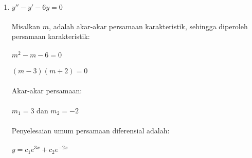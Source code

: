 \begin{enumerate}[1.]

	\item \begin{math} y'' - y' - 6y = 0 \end{math} \\ \\
	Misalkan \begin{math} m \end{math}, adalah akar-akar persamaan karakteristik, sehingga diperoleh persamaan karakteristik: \\ \\
	\begin{math} m^{2} - m - 6 = 0 \end{math} \\ \\
	\begin{math} (m - 3)(m + 2) = 0 \end{math} \\ \\
	Akar-akar persamaan: \\ \\
	\begin{math} m_1 = 3 \end{math} dan \begin{math} m_2 = -2 \end{math} \\ \\
	Penyelesaian umum persamaan diferensial adalah: \\ \\
	\begin{math} y = c_1 e^{3x} + c_2 e^{-2x} \end{math}


\end{enumerate}
